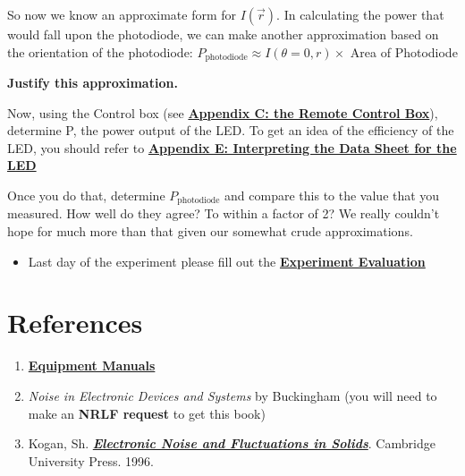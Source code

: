 \documentclass{../lab}
\begin{document}
So now we know an approximate form for $I(\vec{r})$. In calculating the power that would fall upon the photodiode, we can make another approximation based on the orientation of the photodiode: $P_\text{photodiode} \approx I(\theta = 0, r) \times$ Area of Photodiode

\textbf{Justify this approximation.}

Now, using the Control box (see \href{https://berkeley-physics111b.github.io/appendices/LLS-Appendix-C-the-Remote-Control-Box/}{\textbf{Appendix C: the Remote Control Box}}), determine P, the power output of the LED. To get an idea of the efficiency of the LED, you should refer to \href{https://berkeley-physics111b.github.io/appendices/LLS-Appendix-E-Interpreting-the-Data-Sheet-for-the-LED/}{\textbf{Appendix E: Interpreting the Data Sheet for the LED}}

Once you do that, determine $P_\text{photodiode}$ and compare this to the value that you measured. How well do they agree? To within a factor of 2? We really couldn't hope for much more than that given our somewhat crude approximations.

\begin{itemize}
    \item Last day of the experiment please fill out the \href{\ExperimentEvaluation}{\textbf{Experiment Evaluation}}

\end{itemize}

\section{References}
\label{sec:References}

\begin{enumerate}
    \item \hyperref[sec:Apparatus and Equipment]{\textbf{Equipment Manuals}}

    \item \emph{Noise in Electronic Devices and Systems} by Buckingham (you will need to make an \textbf{NRLF request} to get this book)

    \item Kogan, Sh. \href{https://drive.google.com/file/d/1aWtqLOExkqAxR2d9Nur5RaALCpiQvdte/view?usp=drive_link}{\emph{\textbf{Electronic Noise and Fluctuations in Solids}}}. Cambridge University Press. 1996.

\end{enumerate}
\end{document}
